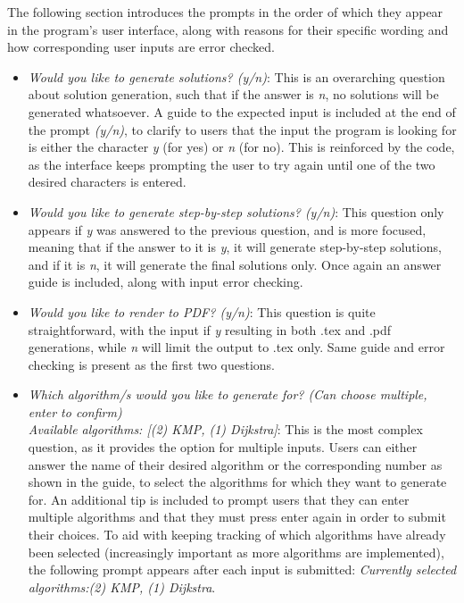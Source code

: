 \documentclass{l4proj}
\begin{document}
The following section introduces the prompts in the order of which they appear in the program's user interface, along with reasons for their specific wording and how corresponding user inputs are error checked.
\begin{itemize}
	\item
	\emph{Would you like to generate solutions? (y/n)}: This is an overarching question about solution generation, such that if the answer is \emph{n}, no solutions will be generated whatsoever. A guide to the expected input is included at the end of the prompt \emph{(y/n)}, to clarify to users that the input the program is looking for is either the character \emph{y} (for yes) or \emph{n} (for no). This is reinforced by the code, as the interface keeps prompting the user to try again until one of the two desired characters is entered.
	\item
	\emph{Would you like to generate step-by-step solutions? (y/n)}: This question only appears if \emph{y} was answered to the previous question, and is more focused, meaning that if the answer to it is \emph{y}, it will generate step-by-step solutions, and if it is \emph{n}, it will generate the final solutions only. Once again an answer guide is included, along with input error checking.
	\item
	\emph{Would you like to render to PDF? (y/n)}: This question is quite straightforward, with the input if \emph{y} resulting in both .tex and .pdf generations, while \emph{n} will limit the output to .tex only. Same guide and error checking is present as the first two questions.
	\item
	\emph{Which algorithm/s would you like to generate for? (Can choose multiple, enter to confirm) \\ Available algorithms: [(2) KMP, (1) Dijkstra]}: This is the most complex question, as it provides the option for multiple inputs. Users can either answer the name of their desired algorithm or the corresponding number as shown in the guide, to select the algorithms for which they want to generate for. An additional tip is included to prompt users that they can enter multiple algorithms and that they must press enter again in order to submit their choices. To aid with keeping tracking of which algorithms have already been selected (increasingly important as more algorithms are implemented), the following prompt appears after each input is submitted: \emph{Currently selected algorithms:(2) KMP, (1) Dijkstra}. 
\end{itemize}
\end{document}
